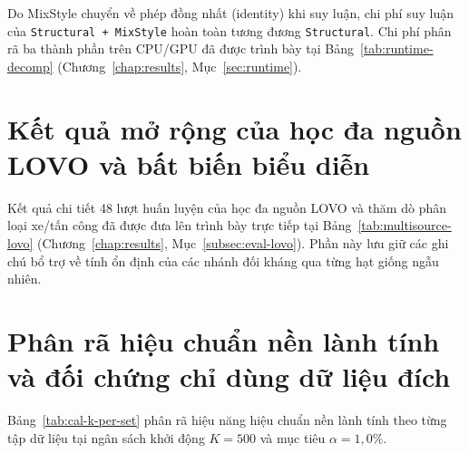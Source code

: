 \documentclass[12pt, a4paper, reqno, oneside]{book}
\DeclareRobustCommand{\code}[1]{\nolinkurl{#1}}
\begin{document}
{Do MixStyle chuyển về phép đồng nhất (identity) khi suy luận, chi phí suy luận của \code{Structural + MixStyle} hoàn toàn tương đương \code{Structural}. Chi phí phân rã ba thành phần trên CPU/GPU đã được trình bày tại Bảng~\ref{tab:runtime-decomp} (Chương~\ref{chap:results}, Mục~\ref{sec:runtime}).

\section{Kết quả mở rộng của học đa nguồn LOVO và bất biến biểu diễn}\label{sec:app-lovo}
Kết quả chi tiết 48 lượt huấn luyện của học đa nguồn LOVO và thăm dò phân loại xe/tấn công đã được đưa lên trình bày trực tiếp tại Bảng~\ref{tab:multisource-lovo} (Chương~\ref{chap:results}, Mục~\ref{subsec:eval-lovo}). Phần này lưu giữ các ghi chú bổ trợ về tính ổn định của các nhánh đối kháng qua từng hạt giống ngẫu nhiên.



\section{Phân rã hiệu chuẩn nền lành tính và đối chứng chỉ dùng dữ liệu đích}
Bảng~\ref{tab:cal-k-per-set} phân rã hiệu năng hiệu chuẩn nền lành tính theo từng tập dữ liệu tại ngân sách khởi động $K=500$ và mục tiêu $\alpha = 1{,}0\%$.

}
\end{document}
